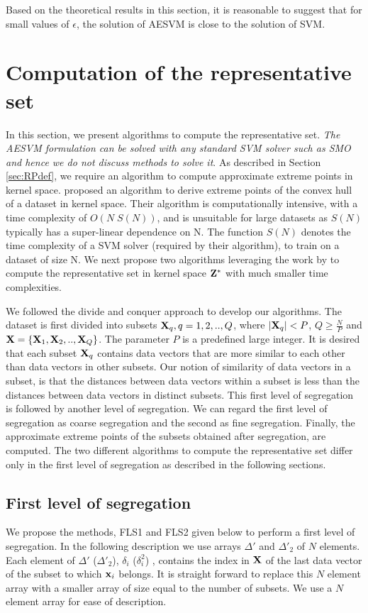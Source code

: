 \documentclass[twoside]{article}
\begin{document}
Based on the theoretical results in this section, it is reasonable to suggest that for small values of $\epsilon$, the solution of AESVM is close to the solution of SVM.

\section{Computation of the representative set} \label{sec:derRP}
In this section, we present algorithms to compute the representative set. {\em The AESVM formulation can be solved with any standard SVM solver such as SMO and hence we do not discuss methods to solve it}. As described in Section \ref{sec:RPdef}, we require an algorithm to compute approximate extreme points in kernel space. \citet{OSUNA02} proposed an algorithm to derive extreme points of the convex hull of a dataset in kernel space. Their algorithm is computationally intensive, with a time complexity of $O(N\;S(N))$, and is unsuitable for large datasets as $S(N)$ typically has a super-linear dependence on N. The function $S(N)$ denotes the time complexity of a SVM solver (required by their algorithm), to train on a dataset of size N. We next propose two algorithms leveraging the work by \citet{OSUNA02} to compute the representative set in kernel space ${\bf Z}^*$ with much smaller time complexities.

We followed the divide and conquer approach to develop our algorithms. The dataset is first divided into subsets ${\bf X}_q, q = 1,2,..,Q$, where $|{\bf X}_q| < P$, $Q \ge \frac{N}{P}$ and ${\bf X} = \{ {\bf X}_1, {\bf X}_2, .., {\bf X}_Q\}$. The parameter $P$ is a predefined large integer. It is desired that each subset ${\bf X}_q$ contains data vectors that are more similar to each other than data vectors in other subsets. Our notion of similarity of data vectors in a subset, is that the distances between data vectors within a subset is less than the distances between data vectors in distinct subsets. This first level of segregation is followed by another level of segregation. We can regard the first level of segregation as coarse segregation and the second as fine segregation. Finally, the approximate extreme points of the subsets obtained after segregation, are computed. The two different algorithms to compute the representative set differ only in the first level of segregation as described in the following sections.

\subsection{First level of segregation}
We propose the methods, FLS1 and FLS2 given below to perform a first level of segregation. In the following description we use arrays $\Delta'$ and $\Delta'_2$ of $N$ elements. Each element of $\Delta'$ ($\Delta' _2$), $\delta_i$ ($\delta_i ^2$) , contains the index in ${\bf X}$ of the last data vector of the subset to which ${\bf x}_i$ belongs. It is straight forward to replace this $N$ element array with a smaller array of size equal to the number of subsets. We use a $N$ element array for ease of description.\newline
\end{document}

